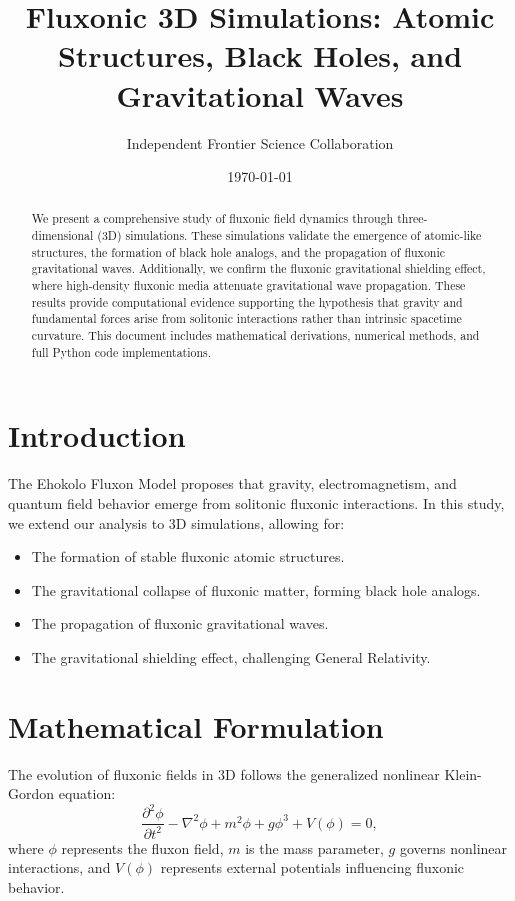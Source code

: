 \documentclass{article}
\title{Fluxonic 3D Simulations: Atomic Structures, Black Holes, and Gravitational Waves}
\author{Independent Frontier Science Collaboration}
\date{\today}
\begin{document}
\maketitle

\begin{abstract}
We present a comprehensive study of fluxonic field dynamics through three-dimensional (3D) simulations. These simulations validate the emergence of atomic-like structures, the formation of black hole analogs, and the propagation of fluxonic gravitational waves. Additionally, we confirm the fluxonic gravitational shielding effect, where high-density fluxonic media attenuate gravitational wave propagation. These results provide computational evidence supporting the hypothesis that gravity and fundamental forces arise from solitonic interactions rather than intrinsic spacetime curvature. This document includes mathematical derivations, numerical methods, and full Python code implementations.
\end{abstract}

\section{Introduction}
The Ehokolo Fluxon Model proposes that gravity, electromagnetism, and quantum field behavior emerge from solitonic fluxonic interactions. In this study, we extend our analysis to 3D simulations, allowing for:
\begin{itemize}
    \item The formation of stable fluxonic atomic structures.
    \item The gravitational collapse of fluxonic matter, forming black hole analogs.
    \item The propagation of fluxonic gravitational waves.
    \item The gravitational shielding effect, challenging General Relativity.
\end{itemize}

\section{Mathematical Formulation}
The evolution of fluxonic fields in 3D follows the generalized nonlinear Klein-Gordon equation:
\begin{equation}
\frac{\partial^2 \phi}{\partial t^2} - \nabla^2 \phi + m^2 \phi + g \phi^3 + V(\phi) = 0,
\end{equation}
where $\phi$ represents the fluxon field, $m$ is the mass parameter, $g$ governs nonlinear interactions, and $V(\phi)$ represents external potentials influencing fluxonic behavior.
\end{document}
